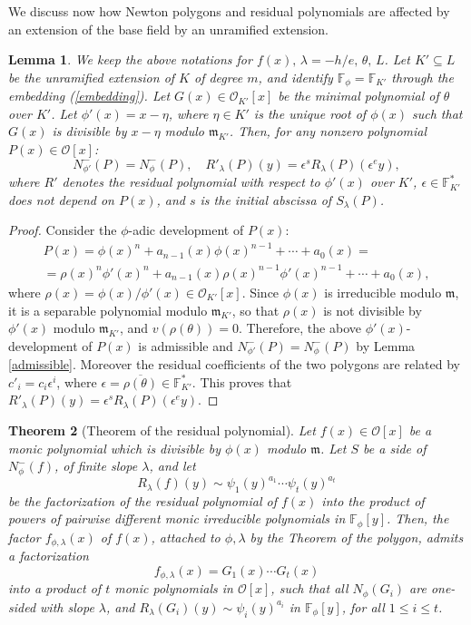 \documentclass{amsart}
\newtheorem{theorem}{Theorem}[section]
\newtheorem{lemma}[theorem]{Lemma}
\def\ff#1{\mathbb{F}_{#1}}
\def\fph{\mathbb{F}_{\phi}}
\def\la{\lambda}
\def\m{{\mathfrak m}}
\def\npp#1{N_{\phi}^-(#1)}
\def\oo{{\mathcal O}}
\def\t{\theta}
\def\zpx{\oo[x]}
\begin{document}
We discuss now how Newton polygons and residual polynomials are affected by an extension of the base field by an unramified extension. 

\begin{lemma}\label{extension}
We keep the above notations for $f(x),\,\la=-h/e,\,\t,\,L$. Let $K'\subseteq L$ be the unramified extension of $K$ of degree $m$, and identify $\fph=\ff{K'}$ through the embedding (\ref{embedding}). Let $G(x)\in \oo_{K'}[x]$ be the minimal polynomial of $\t$ over $K'$. Let $\phi'(x)=x-\eta$, where $\eta\in K'$ is the unique root of $\phi(x)$ such that $G(x)$ is divisible by $x-\eta$ modulo $\m_{K'}$. Then, for any nonzero polynomial $P(x)\in\zpx$:
$$N_{\phi'}^-(P)=N_{\phi}^-(P), \quad R'_{\la}(P)(y)=\epsilon^sR_{\la}(P)(\epsilon^ey),$$
where $R'$ denotes the residual polynomial with respect to $\phi'(x)$ over $K'$, $\epsilon\in\ff{K'}^*$ does not depend on $P(x)$, and $s$ is the initial abscissa of $S_{\la}(P)$.  
\end{lemma}

\begin{proof}
Consider the $\phi$-adic development of $P(x)$:
\begin{multline*}
P(x)=\phi(x)^n+a_{n-1}(x)\phi(x)^{n-1}+\cdots+a_0(x)=\\=\rho(x)^{n}\phi'(x)^n+a_{n-1}(x)\rho(x)^{n-1}\phi'(x)^{n-1}+\cdots+a_0(x),
\end{multline*}
where $\rho(x)= \phi(x)/\phi'(x) \in\oo_{K'}[x]$. Since $\phi(x)$ is irreducible modulo $\m$, it is a separable polynomial modulo $\m_{K'}$, so that $\rho(x)$ is not divisible by $\phi'(x)$ modulo $\m_{K'}$, and
$v(\rho(\t))=0$. Therefore, the above $\phi'(x)$-development of
$P(x)$ is admissible and $N_{\phi'}^-(P)=\npp{P}$ by Lemma \ref{admissible}. Moreover the residual coefficients of the two polygons are related by $c'_i=c_i\epsilon^i$, where $\epsilon=\overline{\rho(\t)}\in\ff{K'}^*$. This proves that
 $R'_{\la}(P)(y)=\epsilon^s R_{\la}(P)(\epsilon^ey)$.
\end{proof}

\begin{theorem}[Theorem of the residual polynomial]\label{thresidual} Let $f(x)\in\zpx$ be a monic polynomial which is divisible by $\phi(x)$ modulo $\m$. Let $S$ be a side of $N_{\phi}^-(f)$, of finite slope  $\la$, and let 
$$
R_{\la}(f)(y)\sim\psi_1(y)^{a_1}\cdots \psi_t(y)^{a_t}
$$be the factorization of the residual polynomial of $f(x)$ into the product of powers of pairwise different monic irreducible polynomials in $\fph[y]$. Then, the factor $f_{\phi,\la}(x)$ of $f(x)$, attached to $\phi,\la$ by the Theorem of the polygon, admits a factorization
$$
f_{\phi,\la}(x)=G_1(x)\cdots G_t(x)
$$into a product of $t$ monic polynomials in $\zpx$, such that all $N_{\phi}(G_i)$ are one-sided with slope $\la$, and
 $R_{\la}(G_i)(y)\sim \psi_i(y)^{a_i}$ in $\fph[y]$, for all $1\le i\le t$.
\end{theorem}
\end{document}
